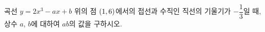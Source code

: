 곡선 $y=2x^3-ax+b$ 위의 점 $(1{,}\mkern3mu\mathopen{}6)$에서의 접선과 수직인 직선의 기울기가 $-\dfrac{1}{3}$일 때, 상수 $a$, $b$에 대하여 $ab$의 값을 구하시오.
